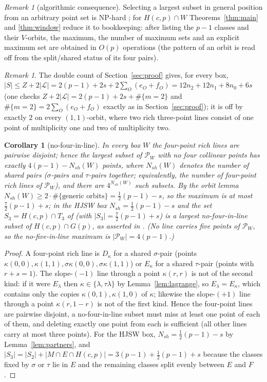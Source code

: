 \documentclass[11pt]{article}
\newtheorem{corollary}[theorem]{Corollary}
\theoremstyle{remark}
\newtheorem{remark}[theorem]{Remark}
\newcommand{\Hc}{H(c,p)}
\newcommand{\Gp}{G(p)}
\newcommand{\Lc}{\mathcal{L}}
\newcommand{\Pset}{\mathcal{P}}
\begin{document}
\begin{remark}[algorithmic consequence]
Selecting a largest subset in general position from an arbitrary point set is NP-hard \cite{FKNN17}; for
$\Hc\cap W$ Theorems~\ref{thm:main} and \ref{thm:window} reduce it to bookkeeping: after listing the $p-1$ classes and their
$V$-orbits, the maximum, the number of maximum sets and an explicit maximum set are obtained in $O(p)$ operations (the
pattern of an orbit is read off from the split/shared status of its four pairs).
\end{remark}

\begin{remark}
The double count of Section~\ref{sec:proof} gives, for every box, $|S|\le Z+2|\Lc|=2(p-1)+2s+2\sum_O(e_O+f_O)=12n_2+12n_1+8n_0+6s$
(one checks $Z+2|\Lc|=2(p-1)+2s+\#\{m=2\}$ and $\#\{m=2\}=2\sum_O(e_O+f_O)$ exactly as in Section~\ref{sec:proof}); it is
off by exactly $2$ on every $(1,1)$-orbit, where two rich three-point lines consist of one point of multiplicity one and two
of multiplicity two.
\end{remark}

\begin{corollary}[no-four-in-line]\label{cor:no4}
In every box $W$ the four-point rich lines are pairwise disjoint; hence the largest subset of $\Pset_W$ with no four
collinear points has exactly $4(p-1)-N_{sh}(W)$ points, where $N_{sh}(W)$ denotes the number of shared pairs ($\sigma$-pairs
and $\tau$-pairs together; equivalently, the number of four-point rich lines of $\Pset_W$), and there are
$4^{N_{sh}(W)}$ such subsets.  By the orbit lemma $N_{sh}(W)\ge2\cdot\#\{\text{generic orbits}\}=\tfrac12(p-1)-s$, so the
maximum is at most $\tfrac72(p-1)+s$; in the HJSW box $N_{sh}=\tfrac12(p-1)-s$ and the set $S_3=\Hc\cap T_3$ of
\cite[Constr.~2.10]{KNS25} (with $|S_3|=\tfrac72(p-1)+s$) is a largest no-four-in-line subset of $\Hc\cap\Gp$, as asserted in
\cite[App.~A]{KNS25}.  (No line carries five points of $\Pset_W$, so the no-five-in-line maximum is $|\Pset_W|=4(p-1)$.)
\end{corollary}

\begin{proof}
A four-point rich line is $D_\kappa$ for a shared $\sigma$-pair (points $\kappa(0,0),\kappa(1,1),\sigma\kappa(0,0),\sigma\kappa(1,1)$)
or $E_\kappa$ for a shared $\tau$-pair (points with $r+s=1$).  The slope-$(-1)$ line through a point $\kappa(r,r)$ is not of
the second kind: if it were $E_\lambda$ then $\kappa\in\{\lambda,\tau\lambda\}$ by Lemma~\ref{lem:lagrange}, so $E_\lambda=E_\kappa$,
which contains only the copies $\kappa(0,1),\kappa(1,0)$ of $\kappa$; likewise the slope-$(+1)$ line through a point
$\kappa(r,1-r)$ is not of the first kind.  Hence the four-point lines are pairwise disjoint, a
no-four-in-line subset must miss at least one point of each of them, and deleting exactly one point from each is
sufficient (all other lines carry at most three points).  For the HJSW box, $N_{sh}=\tfrac12(p-1)-s$ by
Lemma~\ref{lem:partners}, and $|S_3|=|S_2|+|M\cap E\cap\Hc|=3(p-1)+\tfrac12(p-1)+s$ because the classes fixed by $\sigma$ or
$\tau$ lie in $E$ and the remaining classes split evenly between $E$ and $F$ \cite[Obs.~2.9]{KNS25}.
\end{proof}
\end{document}
